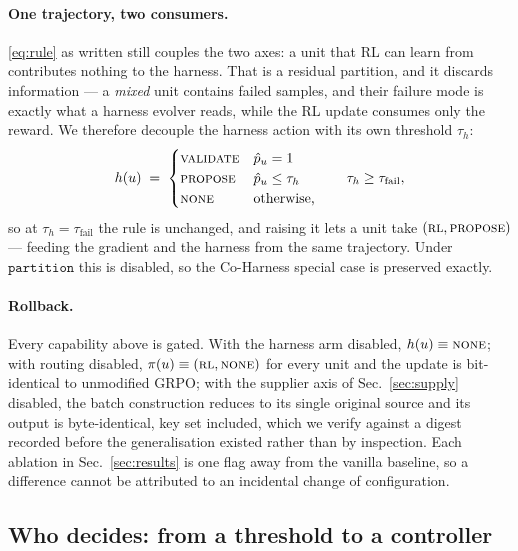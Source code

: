 \paragraph{One trajectory, two consumers.} \eqref{eq:rule} as written still couples the two
axes: a unit that RL can learn from contributes nothing to the harness. That is a residual
partition, and it discards information --- a \emph{mixed} unit contains failed samples, and
their failure mode is exactly what a harness evolver reads, while the RL update consumes only
the reward. We therefore decouple the harness action with its own threshold $\tau_h$:
%
\begin{equation}
  h(u) \;=\;
  \begin{cases}
    \textsc{validate} & \hat p_u = 1 \\
    \textsc{propose}  & \hat p_u \le \tau_h \\
    \textsc{none}     & \text{otherwise,}
  \end{cases}
  \qquad \tau_h \ge \tau_{\text{fail}} ,
  \label{eq:harness}
\end{equation}
%
so at $\tau_h = \tau_{\text{fail}}$ the rule is unchanged, and raising it lets a unit take
$(\textsc{rl}, \textsc{propose})$ --- feeding the gradient and the harness from the same
trajectory. Under $\texttt{partition}$ this is disabled, so the Co-Harness special case is
preserved exactly.

\paragraph{Rollback.} Every capability above is gated. With the harness arm disabled,
$h(u) \equiv \textsc{none}$; with routing disabled, $\pi(u) \equiv (\textsc{rl},
\textsc{none})$ for every unit and the update is bit-identical to unmodified GRPO; with the
supplier axis of Sec.~\ref{sec:supply} disabled, the batch construction reduces to its single
original source and its output is byte-identical, key set included, which we verify against a
digest recorded before the generalisation existed rather than by inspection. Each
ablation in Sec.~\ref{sec:results} is one flag away from the vanilla baseline, so a
difference cannot be attributed to an incidental change of configuration.



\subsection{Who decides: from a threshold to a controller}
\label{sec:controller}

